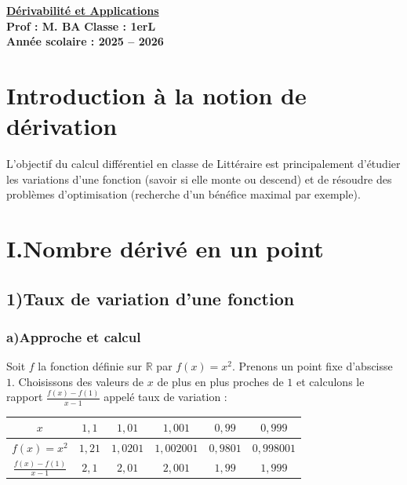 \documentclass[12pt,a4paper]{article}
\newcounter{exemple}
\begin{document}
\begin{center}
    \Large\textbf{\underline{Dérivabilité et Applications}}\\[-0.1cm]
    \normalsize\textbf{Prof : M. BA} \hfill \textbf{Classe : 1erL}\\[-0.1cm]
    \textbf{Année scolaire : 2025 -- 2026}
\end{center}

\section*{Introduction à la notion de dérivation}
L'objectif du calcul différentiel en classe de Littéraire est principalement d'étudier les variations d'une fonction (savoir si elle monte ou descend) et de résoudre des problèmes d'optimisation (recherche d'un bénéfice maximal par exemple).

\section*{I.\quad Nombre dérivé en un point}

\subsection*{1)\quad Taux de variation d'une fonction}

\subsubsection*{a)\quad Approche et calcul}

Soit $f$ la fonction définie sur $\mathbb{R}$ par $f(x)=x^2$. Prenons un point fixe d'abscisse $1$. Choisissons des valeurs de $x$ de plus en plus proches de $1$ et calculons le rapport $\frac{f(x)-f(1)}{x-1}$ appelé taux de variation :

\begin{center}
\begin{tabular}{|c|c|c|c|c|c|}
\hline
$x$ & $1{,}1$ & $1{,}01$ & $1{,}001$ & $0{,}99$ & $0{,}999$ \\
\hline
$f(x) = x^2$ & $1{,}21$ & $1{,}0201$ & $1{,}002001$ & $0{,}9801$ & $0{,}998001$ \\
\hline
$\frac{f(x)-f(1)}{x-1}$ & $2{,}1$ & $2{,}01$ & $2{,}001$ & $1{,}99$ & $1{,}999$ \\
\hline
\end{tabular}
\end{center}

\bigskip
\end{document}
